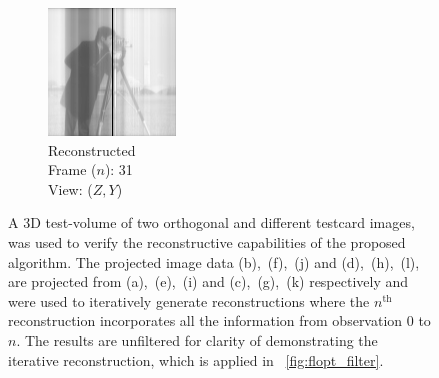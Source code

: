 \documentclass{osa-article}
\begin{document}
\begin{figure}
\begin{subfigure}[t]{0.2\linewidth}
  \end{subfigure}\hfill
  \begin{subfigure}[t]{0.2\linewidth}
    \centering
    \includegraphics[width=\linewidth]{./figures/results/3D_python/no_drift_zelda/31/zx_recon}\caption{Reconstructed\\Frame (\(n\)): 31\\View: (\(Z,Y\))}
  \end{subfigure}
  \caption[A 3D test-volume of two orthogonal and different testcard images, was used to verify the reconstructive capabilities of the proposed algorithm]{
    A 3D test-volume of two orthogonal and different testcard images, was used to verify the reconstructive capabilities of the proposed algorithm.
    The projected image data (b),~(f),~(j) and (d),~(h),~(l), are projected from (a),~(e),~(i) and (c),~(g),~(k) respectively and were used to iteratively generate reconstructions where the \(n^\text{th}\) reconstruction incorporates all the information from observation 0 to \(n\).
    The results are unfiltered for clarity of demonstrating the iterative reconstruction, which is applied in \figurename~\ref{fig:flopt_filter}.
  }\label{fig:recon_iterative}
\end{figure}
\end{document}
